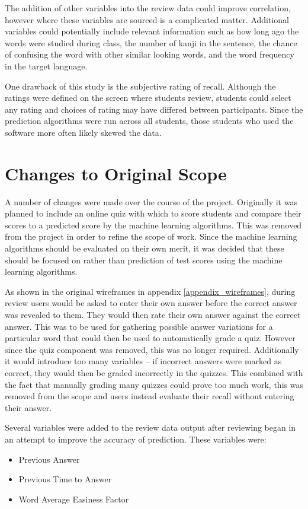 The addition of other variables into the review data could improve correlation,
however where these variables are sourced is a complicated matter. Additional variables
could potentially include relevant information such as how long ago the words were studied
during class, the number of kanji in the sentence, the chance of confusing the word
with other similar looking words, and the word frequency in the target language.

One drawback of this study is the subjective rating of recall. Although the ratings
were defined on the screen where students review, students could select any rating
and choices of rating may have differed between participants. Since the prediction
algorithms were run across all students, those students who used the software more
often likely skewed the data. 

\section{Changes to Original Scope}
A number of changes were made over the course of the project. Originally it was
planned to include an online quiz with which to score students and compare their
scores to a predicted score by the machine learning algorithms. This was removed
from the project in order to refine the scope of work. Since the machine learning
algorithms should be evaluated on their own merit, it was decided that these should
be focused on rather than prediction of test scores using the machine learning
algorithms.

As shown in the original wireframes in appendix \ref{appendix_wireframes}, during review
users would be asked to enter their own answer before the correct answer was revealed
to them. They would then rate their own answer against the correct answer. This was
to be used for gathering possible answer variations for a particular word
that could then be used to automatically grade a quiz. However since the quiz
component was removed, this was no longer required. Additionally it would introduce
too many variables -- if incorrect answers were marked as correct, they would then
be graded incorrectly in the quizzes. This combined with the fact that manually
grading many quizzes could prove too much work, this was removed from the scope
and users instead evaluate their recall without entering their answer.

Several variables were added to the review data output after reviewing began in an
attempt to improve the accuracy of prediction. These
variables were:
\begin{itemize}
  \item Previous Answer
  \item Previous Time to Answer
  \item Word Average Easiness Factor
\end{itemize}

